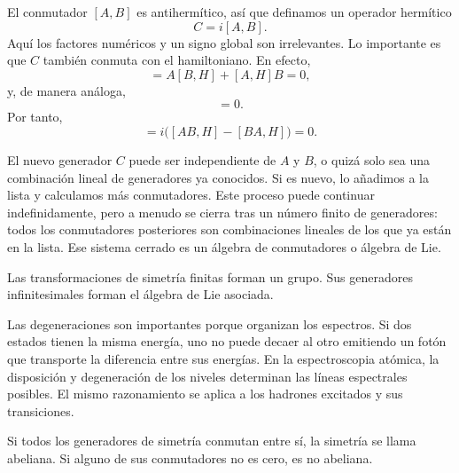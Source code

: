 El conmutador \([A,B]\) es antihermítico, así que definamos un operador hermítico
\begin{equation}
C=i[A,B].
\end{equation}
Aquí los factores numéricos y un signo global son irrelevantes. Lo importante es que \(C\) también conmuta con el hamiltoniano. En efecto,
\begin{equation}
[AB,H]
=A[B,H]+[A,H]B=0,
\end{equation}
y, de manera análoga,
\begin{equation}
[BA,H]=0.
\end{equation}
Por tanto,
\begin{equation}
[C,H]
=i\bigl([AB,H]-[BA,H]\bigr)=0.
\end{equation}

El nuevo generador \(C\) puede ser independiente de \(A\) y \(B\), o quizá solo sea una combinación lineal de generadores ya conocidos. Si es nuevo, lo añadimos a la lista y calculamos más conmutadores. Este proceso puede continuar indefinidamente, pero a menudo se cierra tras un número finito de generadores: todos los conmutadores posteriores son combinaciones lineales de los que ya están en la lista. Ese sistema cerrado es un álgebra de conmutadores o álgebra de Lie.

Las transformaciones de simetría finitas forman un grupo. Sus generadores infinitesimales forman el álgebra de Lie asociada.

Las degeneraciones son importantes porque organizan los espectros. Si dos estados tienen la misma energía, uno no puede decaer al otro emitiendo un fotón que transporte la diferencia entre sus energías. En la espectroscopia atómica, la disposición y degeneración de los niveles determinan las líneas espectrales posibles. El mismo razonamiento se aplica a los hadrones excitados y sus transiciones.

\begin{classroomqa}
\end{classroomqa}

Si todos los generadores de simetría conmutan entre sí, la simetría se llama abeliana. Si alguno de sus conmutadores no es cero, es no abeliana.

